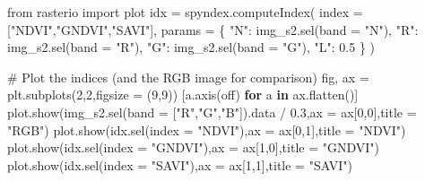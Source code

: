 \documentclass[
  11pt,
  letterpaper,
  open=any,
  twoside=false,
  french]{scrbook}
\newenvironment{Shaded}{\begin{snugshade}}{\end{snugshade}}
\newcommand{\CommentTok}[1]{\textcolor[rgb]{0.37,0.37,0.37}{#1}}
\newcommand{\ControlFlowTok}[1]{\textcolor[rgb]{0.00,0.23,0.31}{\textbf{#1}}}
\newcommand{\DecValTok}[1]{\textcolor[rgb]{0.68,0.00,0.00}{#1}}
\newcommand{\FloatTok}[1]{\textcolor[rgb]{0.68,0.00,0.00}{#1}}
\newcommand{\ImportTok}[1]{\textcolor[rgb]{0.00,0.46,0.62}{#1}}
\newcommand{\KeywordTok}[1]{\textcolor[rgb]{0.00,0.23,0.31}{\textbf{#1}}}
\newcommand{\NormalTok}[1]{\textcolor[rgb]{0.00,0.23,0.31}{#1}}
\newcommand{\OperatorTok}[1]{\textcolor[rgb]{0.37,0.37,0.37}{#1}}
\newcommand{\StringTok}[1]{\textcolor[rgb]{0.13,0.47,0.30}{#1}}
\begin{document}
\begin{Shaded}
\begin{Highlighting}[]
\ImportTok{from}\NormalTok{ rasterio }\ImportTok{import}\NormalTok{ plot}
\NormalTok{idx }\OperatorTok{=}\NormalTok{ spyndex.computeIndex(}
\NormalTok{    index }\OperatorTok{=}\NormalTok{ [}\StringTok{"NDVI"}\NormalTok{,}\StringTok{"GNDVI"}\NormalTok{,}\StringTok{"SAVI"}\NormalTok{],}
\NormalTok{    params }\OperatorTok{=}\NormalTok{ \{}
        \StringTok{"N"}\NormalTok{: img\_s2.sel(band }\OperatorTok{=} \StringTok{"N"}\NormalTok{),}
        \StringTok{"R"}\NormalTok{: img\_s2.sel(band }\OperatorTok{=} \StringTok{"R"}\NormalTok{),}
        \StringTok{"G"}\NormalTok{: img\_s2.sel(band }\OperatorTok{=} \StringTok{"G"}\NormalTok{),}
        \StringTok{"L"}\NormalTok{: }\FloatTok{0.5}
\NormalTok{    \}}
\NormalTok{)}

\CommentTok{\# Plot the indices (and the RGB image for comparison)}
\NormalTok{fig, ax }\OperatorTok{=}\NormalTok{ plt.subplots(}\DecValTok{2}\NormalTok{,}\DecValTok{2}\NormalTok{,figsize }\OperatorTok{=}\NormalTok{ (}\DecValTok{9}\NormalTok{,}\DecValTok{9}\NormalTok{))}
\NormalTok{[a.axis(}\StringTok{\textquotesingle{}off\textquotesingle{}}\NormalTok{) }\ControlFlowTok{for}\NormalTok{ a }\KeywordTok{in}\NormalTok{ ax.flatten()]}
\NormalTok{plot.show(img\_s2.sel(band }\OperatorTok{=}\NormalTok{ [}\StringTok{"R"}\NormalTok{,}\StringTok{"G"}\NormalTok{,}\StringTok{"B"}\NormalTok{]).data }\OperatorTok{/} \FloatTok{0.3}\NormalTok{,ax }\OperatorTok{=}\NormalTok{ ax[}\DecValTok{0}\NormalTok{,}\DecValTok{0}\NormalTok{],title }\OperatorTok{=} \StringTok{"RGB"}\NormalTok{)}
\NormalTok{plot.show(idx.sel(index }\OperatorTok{=} \StringTok{"NDVI"}\NormalTok{),ax }\OperatorTok{=}\NormalTok{ ax[}\DecValTok{0}\NormalTok{,}\DecValTok{1}\NormalTok{],title }\OperatorTok{=} \StringTok{"NDVI"}\NormalTok{)}
\NormalTok{plot.show(idx.sel(index }\OperatorTok{=} \StringTok{"GNDVI"}\NormalTok{),ax }\OperatorTok{=}\NormalTok{ ax[}\DecValTok{1}\NormalTok{,}\DecValTok{0}\NormalTok{],title }\OperatorTok{=} \StringTok{"GNDVI"}\NormalTok{)}
\NormalTok{plot.show(idx.sel(index }\OperatorTok{=} \StringTok{"SAVI"}\NormalTok{),ax }\OperatorTok{=}\NormalTok{ ax[}\DecValTok{1}\NormalTok{,}\DecValTok{1}\NormalTok{],title }\OperatorTok{=} \StringTok{"SAVI"}\NormalTok{)}
\end{Highlighting}
\end{Shaded}
\end{document}
